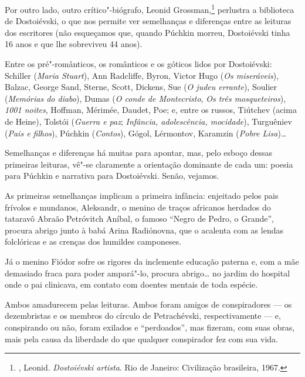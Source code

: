 Por outro lado, outro crítico"-biógrafo, Leonid Grossman,\footnote{, Leonid. \emph{Dostoiévski artista}. Rio de Janeiro: Civilização brasileira, 1967.} perlustra a biblioteca de Dostoiévski, o que nos permite ver semelhanças e diferenças entre as leituras dos escritores (não esqueçamos que, quando Púchkin morreu, Dostoiévski tinha 16 anos e que lhe sobreviveu 44 anos).

Entre os pré"-românticos, os românticos e os góticos lidos por
Dostoiévski: Schiller (\emph{Maria Stuart}), Ann Radcliffe, Byron,
Victor Hugo (\emph{Os miseráveis}), Balzac, George Sand, Sterne, Scott, Dickens, Sue (\emph{O judeu errante}), Soulier (\emph{Memórias
do diabo}), Dumas (\emph{O conde de Montecristo}, \emph{Os três
mosqueteiros}), \emph{1001 noites}, Hoffman, Mérimée, Daudet, Poe; e,
entre os russos, Tiútchev (acima de Heine), Tolstói (\emph{Guerra e paz}; \emph{Infância, adolescência, mocidade}), Turguêniev (\emph{Pais e
filhos}), Púchkin (\emph{Contos}), Gógol, Lérmontov, Karamzin (\emph{Pobre Lisa})\ldots{}

Semelhanças e diferenças há muitas para apontar, mas, pelo esboço dessas primeiras leituras, vê"-se claramente a orientação dominante de cada um: poesia para Púchkin e narrativa para Dostoiévski. Senão, vejamos.

As primeiras semelhanças implicam a primeira infância: enjeitado pelos pais frívolos e mundanos, Aleksandr, o menino de traços africanos herdados do tataravô Abraão Petróvitch Aníbal, o famoso ``Negro de Pedro, o Grande'', procura abrigo junto à babá Arina Radiónovna, que o acalenta com as lendas folclóricas e as crenças dos humildes camponeses.

Já o menino Fiódor sofre os rigores da inclemente educação paterna
e, com a mãe demasiado fraca para poder ampará"-lo, procura
abrigo\ldots{} no jardim do hospital onde o pai clinicava, em contato com doentes mentais de toda espécie.

Ambos amadurecem pelas leituras. Ambos foram amigos de conspiradores
--- os dezembristas e os membros do círculo de Petrachévski,
respectivamente --- e, conspirando ou não, foram exilados e
``perdoados'', mas fizeram, com suas obras, mais pela
causa da liberdade do que qualquer conspirador fez com sua
vida.

